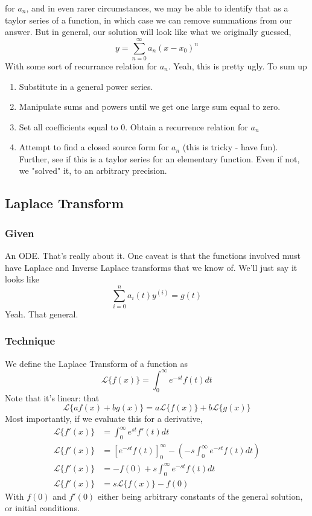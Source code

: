 \documentclass[11pt]{article}
\begin{document}
for $a_n$, and in even rarer circumstances, we may be able to identify that as a taylor series of a
function, in which case we can remove summations from our answer. But in general, our solution will
look like what we originally guessed,
    \[ y = \sum_{n=0}^{\infty}a_n(x - x_0)^n \]
With some sort of recurrance relation for $a_n$. Yeah, this is pretty ugly. To sum up
\begin{enumerate}
    \item Substitute in a general power series.
    \item Manipulate sums and powers until we get one large sum equal to zero.
    \item Set all coefficients equal to 0. Obtain a recurrence relation for $a_n$
    \item Attempt to find a closed source form for $a_n$ (this is tricky - have fun). Further, see 
          if this is a taylor series for an elementary function. Even if not, we "solved" it, to
          an arbitrary precision.
\end{enumerate}
\subsection{Laplace Transform}
\subsubsection{Given}
An ODE. That's really about it. One caveat is that the functions involved must have Laplace and 
Inverse Laplace transforms that we know of. We'll just say it looks like
    \[ \sum_{i=0}^n a_i(t)y^{(i)}= g(t) \]
Yeah. That general.
\subsubsection{Technique}
We define the Laplace Transform of a function as
\[ \mathscr{L}\{f(x)\} = \int_{0}^{\infty} e^{-st}f(t)dt \]
Note that it's linear: that
\[ \mathscr{L}\{af(x) + bg(x)\} = a\mathscr{L}\{f(x)\} + b\mathscr{L}\{g(x)\} \]
Most importantly, if we evaluate this for a derivative,
\begin{align*}
    \mathscr{L}\{f'(x)\} &= \int_{0}^{\infty} e^{st}f'(t)dt  \\
    \mathscr{L}\{f'(x)\} &=  \left[ e^{-st}f(t)\right]_0^{\infty} -\left(- s\int_0^{\infty} e^{-st}f(t)dt \right)  \\
    \mathscr{L}\{f'(x)\} &=   -f(0) + s\int_0^{\infty} e^{-st}f(t)dt  \\
    \mathscr{L}\{f'(x)\} &=   s\mathscr{L}\{f(x)\} - f(0)
\end{align*}
With $f(0)$ and $f'(0)$ either being arbitrary constants of the general solution, or initial conditions.
\end{document}
